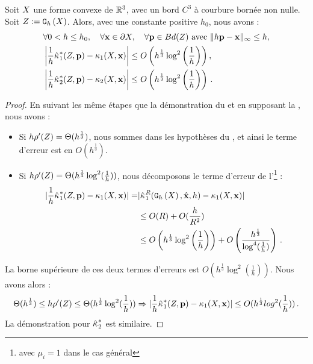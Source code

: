 \begin{observation}{}
  \label{obs:curvature-estimator-3d-k1k2-pf-conv}
  Soit $X$ une forme convexe de $\mathbb{R}^3$, avec un bord $C^3$ à
  courbure bornée non nulle. Soit $Z := \mathtt{G}_{h}\left(X\right)$. Alors, avec une
  constante positive $h_0$, nous avons :
  \begin{align}
    &\forall 0 < h \le h_0, \quad \forall \mathbf{x} \in \partial X, \quad \forall \mathbf{p} \in Bd({Z}) \text{~avec~} \| h\mathbf{p} -\mathbf{x}\|_\infty \le h , \nonumber\\
    &\left | \frac{1}{h}\hat{\kappa_{}}_{1}^{*}(Z,\mathbf{p}) - \kappa_{1}(X,\mathbf{x}) \right| \le O\left( h^{\frac{1}{3}} \log^2 \left(\frac{1}{h}\right)\right),\\
    &\left | \frac{1}{h}\hat{\kappa_{}}_{2}^{*}(Z,\mathbf{p}) - \kappa_{2}(X,\mathbf{x}) \right| \le O\left( h^{\frac{1}{3}} \log^2 \left(\frac{1}{h}\right)\right) \,.
  \end{align}
\end{observation}
\begin{proof}
  En suivant les même étapes que la démonstration du
   et en supposant la
  , nous avons :
  \begin{itemize}
    \item Si $h\rho'(Z) = \Theta(h^{\frac{1}{3}})$, nous sommes dans les hypothèses du , et ainsi le terme d'erreur est en $O(h^\frac{1}{3})$.
    \item Si $h\rho'(Z) = \Theta(h^{\frac{1}{3}} \log^2 (\frac{1}{h}))$,
    nous décomposons le terme d'erreur de
    l'\footnote{avec $\mu_i = 1$
    dans le cas général} :
    \begin{align}
      |\frac{1}{h}\hat{\kappa_{}}_{1}^{*}(Z, \mathbf{p}) - \kappa_{1}(X, \mathbf{x}) | =  &| \hat{\kappa_{}}_{1}^{R}(\mathtt{G}_{h}\left(X\right),\hat{\mathbf{x}},h) - \kappa_{1}(X,\mathbf{x}) |  \nonumber \\
      & \le O(R) + O( \frac{h}{R^2}) \\
      & \le O\left(h^{\frac{1}{3}} \log^2 \left(\frac{1}{h}\right)\right) + O\left( \frac{h^{\frac{1}{3}}}{\log^4 (\frac{1}{h})} \right) \,.
    \end{align}
  \end{itemize}
  La borne supérieure de ces deux termes d'erreurs est $O\left(h^{\frac{1}{3}}
  \log^2 \left(\frac{1}{h}\right)\right)$. Nous avons alors :
  \begin{equation}
    \Theta(h^{\frac{1}{3}}) \le h{\rho'(Z)} \le \Theta(h^{\frac{1}{3}}
    \log^2 (\frac{1}{h})) \Rightarrow | \frac{1}{h}\hat{\kappa_{}}_{1}^{*}(Z, \mathbf{p}) -
    \kappa_{1}(X, \mathbf{x}) | \le O(h^{\frac{1}{3}} log^2({\frac{1}{h}})) \,.
  \end{equation}
  La démonstration pour $\hat{\kappa_{}}_{2}^{*}$ est similaire.
\end{proof}

